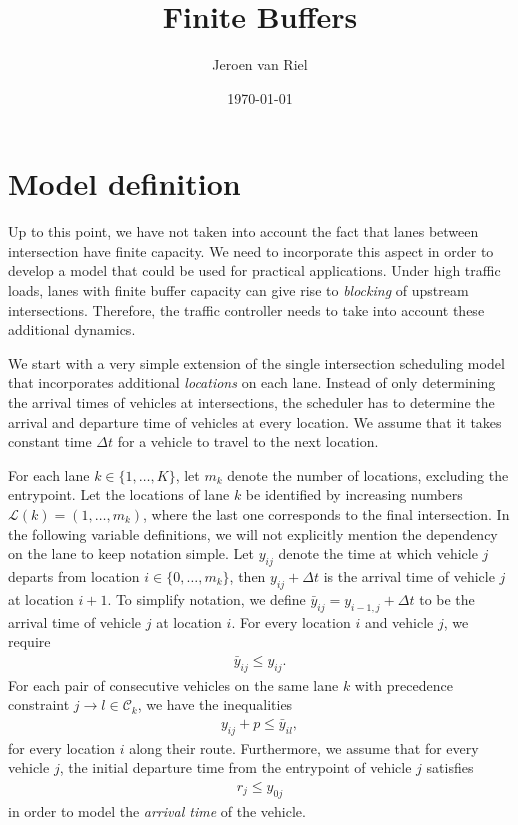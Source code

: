 \documentclass{article}
\title{Finite Buffers}
\author{Jeroen van Riel}
\date{\monthyeardate\today}
\theoremstyle{definition}
\theoremstyle{plain}
\begin{document}
\maketitle

\section{Model definition}

Up to this point, we have not taken into account the fact that lanes between
intersection have finite capacity. We need to incorporate this aspect in order
to develop a model that could be used for practical applications. Under high
traffic loads, lanes with finite buffer capacity can give rise to
\textit{blocking} of upstream intersections. Therefore, the traffic controller
needs to take into account these additional dynamics.

We start with a very simple extension of the single intersection scheduling
model that incorporates additional \textit{locations} on each lane. Instead of
only determining the arrival times of vehicles at intersections, the scheduler
has to determine the arrival and departure time of vehicles at every location.
We assume that it takes constant time $\Delta t$ for a vehicle to travel to the
next location.

For each lane $k \in \{1, \dots, K\}$, let $m_{k}$ denote the number of
locations, excluding the entrypoint. Let the locations of lane $k$ be identified
by increasing numbers $\mathcal{L}(k) = (1, \dots , m_{k})$, where the last one
corresponds to the final intersection. In the following variable definitions, we
will not explicitly mention the dependency on the lane to keep notation simple.
Let $y_{ij}$ denote the time at which vehicle $j$ departs from location
$i \in \{ 0, \dots, m_{k} \}$, then $y_{ij} + \Delta t$ is the arrival time of
vehicle $j$ at location $i+1$. To simplify notation, we define
$\bar{y}_{ij} = y_{i-1,j} + \Delta t$ to be the arrival time of vehicle $j$ at
location $i$. For every location $i$ and vehicle $j$, we require
\begin{align}
  \label{eq:constr1}
  \bar{y}_{ij} \leq y_{ij} .
\end{align}
For each pair of consecutive vehicles on the same lane $k$ with precedence
constraint $j \rightarrow l \in \mathcal{C}_{k}$, we have the inequalities
\begin{align}
  \label{eq:constr2}
  y_{ij} + p \leq \bar{y}_{il} ,
\end{align}
for every location $i$ along their route. Furthermore, we assume that for every
vehicle $j$, the initial departure time from the entrypoint of vehicle $j$ satisfies
\begin{align}
  \label{eq:release}
 r_{j} \leq y_{0j}
\end{align}
in order to model the \textit{arrival time} of the vehicle.
\end{document}
